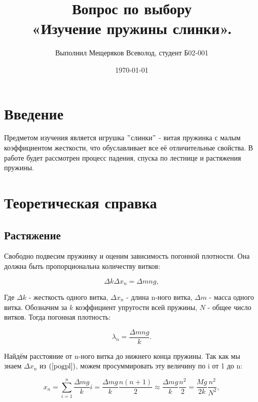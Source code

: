 \documentclass[a4paper,12pt]{report}
\author{Выполнил Мещеряков Всеволод, студент Б02-001}
\title{Вопрос по выбору \\[15pt] «Изучение пружины слинки».}
\date{\today}
\begin{document}
\maketitle

\tableofcontents

\newpage

\section*{Введение} \text{ }

	Предметом изучения является игрушка $"$слинки$"$ - витая пружинка с малым коэффициентом жесткости, что обуславливает все её отличительные свойства. В работе будет рассмотрен процесс падения, спуска по лестнице и растяжения пружины.

\section*{Теоретическая справка}

\subsection*{Растяжение} \text{ }

Свободно подвесим пружинку и оценим зависимость погонной плотности. Она должна быть пропорциональна количеству витков:

\begin{equation} \label{pogpl}
	\Delta k \Delta x_n = \Delta m n g,
\end{equation}

Где $\Delta k$ - жесткость одного витка, $\Delta x_n$ - длина n-ного витка, $\Delta m$ - масса одного витка. Обозначим за $k$ коэффициент упругости всей пружины, $N$ - общее число витков. Тогда погонная плотность:

\begin{equation} \label{pogpln}
	\lambda_n=\frac{\Delta m n g}{k}.
\end{equation}

Найдём расстояние от n-ного витка до нижнего конца пружины. Так как мы знаем $\Delta x_n$ из $(\ref{pogpl})$, можем просуммировать эту величину по i от 1 до n:

\begin{equation} \label{sumlength}
	x_n=\sum_{i=1}^n \frac{\Delta m g}{k} i = \frac{\Delta m g}{k} \frac{n(n+1)}{2} \approx \frac{\Delta m g}{k} \frac{n^2}{2} = \frac{Mg}{2k} \frac{n^2}{N^2},
\end{equation}
\end{document}

